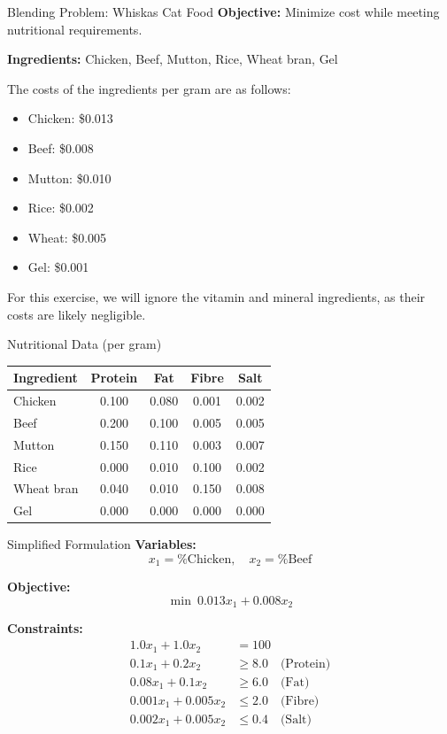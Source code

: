 \documentclass{purdue-slide}
\begin{document}
\begin{frame}{Blending Problem: Whiskas Cat Food}
	\textbf{Objective:} Minimize cost while meeting nutritional requirements.

	\bigskip

	\textbf{Ingredients:} Chicken, Beef, Mutton, Rice, Wheat bran, Gel

	\bigskip

	The costs of the ingredients per gram are as follows:
	\begin{itemize}
		\item Chicken: \$0.013
		\item Beef: \$0.008
		\item Mutton: \$0.010
		\item Rice: \$0.002
		\item Wheat: \$0.005
		\item Gel: \$0.001
	\end{itemize}

	For this exercise, we will ignore the vitamin and mineral ingredients, as their costs are likely negligible.
\end{frame}

\begin{frame}{Nutritional Data (per gram)}
	\centering
	\begin{tabular}{lcccc}
		\toprule
		Ingredient & Protein & Fat & Fibre & Salt \\
		\midrule
		Chicken     & 0.100 & 0.080 & 0.001 & 0.002 \\
		Beef        & 0.200 & 0.100 & 0.005 & 0.005 \\
		Mutton      & 0.150 & 0.110 & 0.003 & 0.007 \\
		Rice        & 0.000 & 0.010 & 0.100 & 0.002 \\
		Wheat bran  & 0.040 & 0.010 & 0.150 & 0.008 \\
		Gel         & 0.000 & 0.000 & 0.000 & 0.000 \\
		\bottomrule
	\end{tabular}
\end{frame}

\begin{frame}{Simplified Formulation}
	\textbf{Variables:}
	\[
		x_1 = \% \text{Chicken}, \quad x_2 = \% \text{Beef}
	\]

	\textbf{Objective:}
	\[
		\min\ 0.013x_1 + 0.008x_2
	\]

	\textbf{Constraints:}
	\begin{align*}
		1.0x_1 + 1.0x_2 &= 100 \\
		0.1x_1 + 0.2x_2 &\ge 8.0 \quad \text{(Protein)} \\
		0.08x_1 + 0.1x_2 &\ge 6.0 \quad \text{(Fat)} \\
		0.001x_1 + 0.005x_2 &\le 2.0 \quad \text{(Fibre)} \\
		0.002x_1 + 0.005x_2 &\le 0.4 \quad \text{(Salt)}
	\end{align*}
\end{frame}
\end{document}
